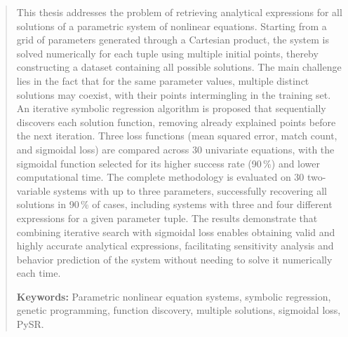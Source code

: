 \begin{abstract}
	This thesis addresses the problem of retrieving analytical expressions for all solutions of a parametric system of nonlinear equations. Starting from a grid of parameters generated through a Cartesian product, the system is solved numerically for each tuple using multiple initial points, thereby constructing a dataset containing all possible solutions. The main challenge lies in the fact that for the same parameter values, multiple distinct solutions may coexist, with their points intermingling in the training set. An iterative symbolic regression algorithm is proposed that sequentially discovers each solution function, removing already explained points before the next iteration. Three loss functions (mean squared error, match count, and sigmoidal loss) are compared across 30 univariate equations, with the sigmoidal function selected for its higher success rate (90\,\%) and lower computational time. The complete methodology is evaluated on 30 two-variable systems with up to three parameters, successfully recovering all solutions in 90\,\% of cases, including systems with three and four different expressions for a given parameter tuple. The results demonstrate that combining iterative search with sigmoidal loss enables obtaining valid and highly accurate analytical expressions, facilitating sensitivity analysis and behavior prediction of the system without needing to solve it numerically each time.

	

	
	\textbf{Keywords:} Parametric nonlinear equation systems, symbolic regression, genetic programming, function discovery, multiple solutions, sigmoidal loss, PySR.
\end{abstract}